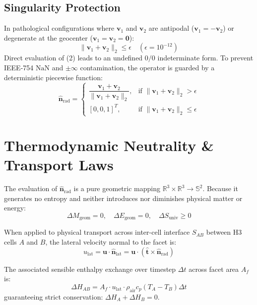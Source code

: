 \documentclass[10pt,journal,compsoc]{IEEEtran}
\begin{document}
\subsection{Singularity Protection}
In pathological configurations where $\mathbf{v}_1$ and $\mathbf{v}_2$ are antipodal ($\mathbf{v}_1 = -\mathbf{v}_2$) or degenerate at the geocenter ($\mathbf{v}_1 = \mathbf{v}_2 = \mathbf{0}$):
\begin{equation}
\|\mathbf{v}_1 + \mathbf{v}_2\|_2 \le \epsilon \quad (\epsilon = 10^{-12})
\end{equation}
Direct evaluation of (2) leads to an undefined $0/0$ indeterminate form. To prevent IEEE-754 $\mathrm{NaN}$ and $\pm\infty$ contamination, the operator is guarded by a deterministic piecewise function:
\begin{equation}
\hat{\mathbf{n}}_{\text{rad}} = \begin{cases}
\dfrac{\mathbf{v}_1 + \mathbf{v}_2}{\|\mathbf{v}_1 + \mathbf{v}_2\|_2}, & \text{if } \|\mathbf{v}_1 + \mathbf{v}_2\|_2 > \epsilon \\[1em]
[0, 0, 1]^T, & \text{if } \|\mathbf{v}_1 + \mathbf{v}_2\|_2 \le \epsilon
\end{cases}
\end{equation}

\section{Thermodynamic Neutrality \& Transport Laws}
The evaluation of $\hat{\mathbf{n}}_{\text{rad}}$ is a pure geometric mapping $\mathbb{R}^3 \times \mathbb{R}^3 \to \mathbb{S}^2$. Because it generates no entropy and neither introduces nor diminishes physical matter or energy:
\begin{equation}
\Delta M_{\text{geom}} = 0, \quad \Delta E_{\text{geom}} = 0, \quad \Delta S_{\text{univ}} \ge 0
\end{equation}

When applied to physical transport across inter-cell interface $S_{AB}$ between H3 cells $A$ and $B$, the lateral velocity normal to the facet is:
\begin{equation}
u_{\text{lat}} = \mathbf{u} \cdot \hat{\mathbf{n}}_{\text{lat}} = \mathbf{u} \cdot (\hat{\mathbf{t}} \times \hat{\mathbf{n}}_{\text{rad}})
\end{equation}

The associated sensible enthalpy exchange over timestep $\Delta t$ across facet area $A_f$ is:
\begin{equation}
\Delta H_{AB} = A_f \cdot u_{\text{lat}} \cdot \rho_{\text{air}} c_p (T_A - T_B) \Delta t
\end{equation}
guaranteeing strict conservation: $\Delta H_A + \Delta H_B = 0$.
\end{document}
